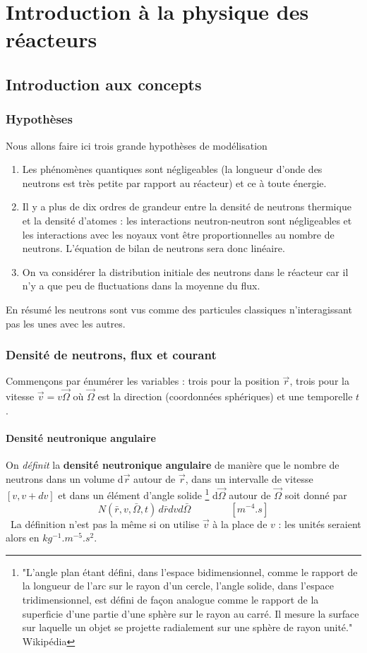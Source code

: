 \chapter{Introduction à la physique des réacteurs}
\section{Introduction aux concepts}
\subsection{Hypothèses}
Nous allons faire ici trois grande hypothèses de modélisation
\begin{enumerate}
\item Les phénomènes quantiques sont négligeables (la longueur d'onde des neutrons est très petite 
par rapport au réacteur) et ce à toute énergie.
\item Il y a plus de dix ordres de grandeur entre la densité de neutrons thermique et la densité 
d'atomes : les interactions neutron-neutron sont négligeables et les interactions avec les noyaux 
vont être proportionnelles au nombre de neutrons. L'équation de bilan de neutrons sera donc linéaire.
\item On va considérer la distribution initiale des neutrons dans le réacteur car il n'y a que peu 
de fluctuations dans la moyenne du flux.
\end{enumerate}
En résumé les neutrons sont vus comme des particules classiques n'interagissant pas les unes avec 
les autres.

\subsection{Densité de neutrons, flux et courant}
Commençons par énumérer les variables : trois pour la position $\vec{r}$, trois pour la vitesse 
$\vec{v} =v\vec{\Omega}$ où $\vec\Omega$ est la direction (coordonnées sphériques) et une temporelle
$t$.

\subsubsection{Densité neutronique angulaire}
On \textit{définit} la \textbf{densité neutronique angulaire} de manière que le nombre de neutrons dans 
un volume d$\vec{r}$ autour de $\vec{r}$, dans un intervalle de vitesse $[v,v+dv]$ et dans un 
élément d'angle solide \footnote{"L'angle plan étant défini, dans l'espace bidimensionnel, comme le rapport de la longueur de l'arc sur le rayon d'un cercle, l'angle solide, dans l'espace tridimensionnel, est défini de façon analogue comme le rapport de la superficie d'une partie d'une sphère sur le rayon au carré.
Il mesure la surface sur laquelle un objet se projette radialement sur une sphère de rayon unité." Wikipédia}
 d$\vec\Omega$ autour de $\vec{\Omega}$ soit donné par
\begin{equation}
N(\bar r,v,\bar \Omega ,t)\,d\bar rdvd\bar \Omega\qquad\qquad [m^{-4}.s]
\end{equation}
\danger\ La définition n'est pas la même si on utilise $\vec{v}$ à la place de $v$ : les unités 
seraient alors en $kg^{-1}.m^{-5}.s^2$.

